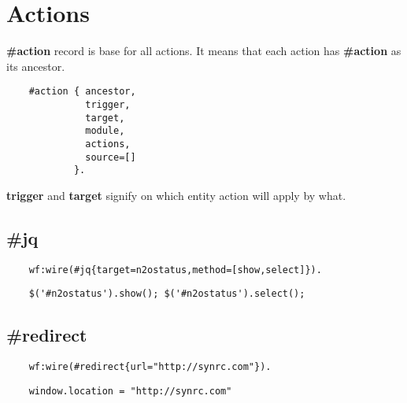 \section{Actions}
{\bf \#action} record is base for all actions. It means that each action
has {\bf \#action} as its ancestor.

\vspace{1\baselineskip}
\begin{lstlisting}
    #action { ancestor,
              trigger,
              target,
              module,
              actions,
              source=[]
            }.
\end{lstlisting}
\vspace{1\baselineskip}

{\bf trigger} and {\bf target} signify on which entity action will apply by what.

\subsection{\#jq}

\vspace{1\baselineskip}
\begin{lstlisting}
    wf:wire(#jq{target=n2ostatus,method=[show,select]}).
\end{lstlisting}
\vspace{1\baselineskip}

\vspace{1\baselineskip}
\begin{lstlisting}
    $('#n2ostatus').show(); $('#n2ostatus').select();
\end{lstlisting}
\vspace{1\baselineskip}

\subsection{\#redirect}
\vspace{1\baselineskip}
\begin{lstlisting}
    wf:wire(#redirect{url="http://synrc.com"}).
\end{lstlisting}
\vspace{1\baselineskip}

\vspace{1\baselineskip}
\begin{lstlisting}
    window.location = "http://synrc.com"
\end{lstlisting}
\vspace{1\baselineskip}

